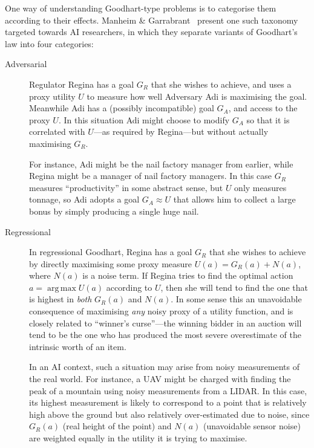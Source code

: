 \documentclass[11pt]{article}
\DeclareMathOperator*{\argmax}{arg\,max}
\begin{document}
One way of understanding Goodhart-type problems is to categorise them according
to their effects.
%
Manheim \& Garrabrant~\cite{manheim18categorizing} present one such taxonomy
targeted towards AI researchers, in which they separate variants of Goodhart's
law into four categories:
%
\begin{description}
  \item[Adversarial]
    Regulator Regina has a goal $G_R$ that she wishes to achieve, and uses a
    proxy utility $U$ to measure how well Adversary Adi is maximising the
    goal.
    Meanwhile Adi has a (possibly incompatible) goal $G_A$, and access to the
    proxy $U$.
    In this situation Adi might choose to modify $G_A$ so that it is correlated
    with $U$---as required by Regina---but without actually maximising $G_R$.

    For instance, Adi might be the nail factory manager from earlier, while
    Regina might be a manager of nail factory managers.
    In this case $G_R$ measures ``productivity'' in some abstract sense, but $U$
    only measures tonnage, so Adi adopts a goal $G_A \approx U$ that allows him
    to collect a large bonus by simply producing a single huge nail.

  \item[Regressional]
    In regressional Goodhart, Regina has a goal $G_R$ that she wishes to achieve
    by directly maximising some proxy measure $U(a) = G_R(a) + N(a)$, where
    $N(a)$ is a noise term.
    If Regina tries to find the optimal action $a = \argmax U(a)$ according to
    $U$, then she will tend to find the one that is highest in \textit{both}
    $G_R(a)$ and $N(a)$.
    In some sense this an unavoidable consequence of maximising \textit{any}
    noisy proxy of a utility function, and is closely related to ``winner's
    curse''---the winning bidder in an auction will tend to be the one who has
    produced the most severe overestimate of the intrinsic worth of an item.

    In an AI context, such a situation may arise from noisy measurements of the real
    world.
    For instance, a UAV might be charged with finding the peak of a mountain
    using noisy measurements from a LIDAR.
    In this case, its highest measurement is likely to correspond to a point
    that is relatively high above the ground but also relatively over-estimated
    due to noise, since $G_R(a)$ (real height of the point) and $N(a)$
    (unavoidable sensor noise) are weighted equally in the utility it is trying
    to maximise.


\end{description}
\end{document}
